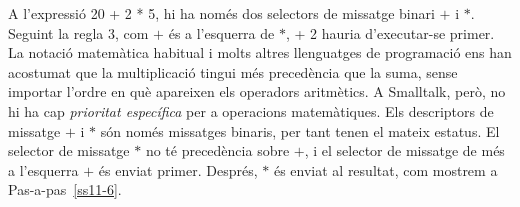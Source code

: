 A l'expressió \textsf{20 + 2 * 5},  hi ha només dos selectors de missatge binari \textsf{$+$} i \textsf{$*$}. Seguint la regla 3, com \textsf{$+$} és a l'esquerra de \textsf{$*$}, \textsf{+ 2} hauria d'executar-se primer. La notació matemàtica habitual i molts altres llenguatges de programació ens han acostumat que la multiplicació tingui més precedència que la suma, sense importar l'ordre en què apareixen els operadors aritmètics. A Smalltalk, però, no hi ha cap \emph{prioritat específica} per a operacions matemàtiques. Els descriptors de missatge \textsf{$+$} i \textsf{$*$} són només missatges binaris,  per tant tenen el mateix estatus. El selector de missatge \textsf{$*$} no té precedència sobre \textsf{$+$}, i el selector de missatge de més a l'esquerra \textsf{$+$} és enviat primer. Després, \textsf{$*$} és enviat al resultat, com mostrem a Pas-a-pas~\ref{ss11-6}.


